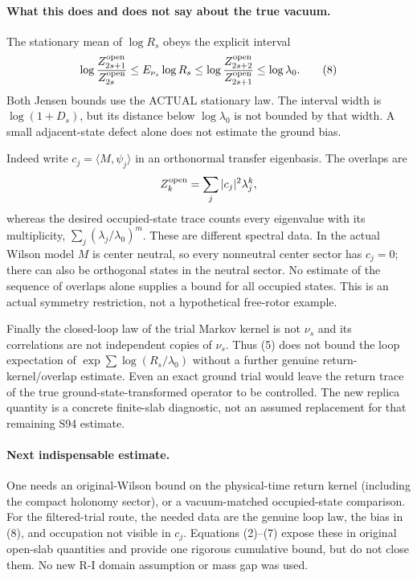 \documentclass[11pt]{article}
\begin{document}
\paragraph{What this does and does not say about the true vacuum.}
The stationary mean of $\log R_s$ obeys the explicit interval
\[
 \log\frac{Z_{2s+1}^{\rm open}}{Z_{2s}^{\rm open}}
 \le E_{\nu_s}\log R_s
 \le\log\frac{Z_{2s+2}^{\rm open}}{Z_{2s+1}^{\rm open}}
 \le\log\lambda_0.                                   \tag{8}
\]
Both Jensen bounds use the ACTUAL stationary law. The interval width is
$\log(1+D_s)$, but its distance below $\log\lambda_0$ is not bounded by that
width. A small adjacent-state defect alone does not estimate the ground bias.

Indeed write $c_j=\langle M,\psi_j\rangle$ in an orthonormal transfer eigenbasis.
The overlaps are
\[
 Z_k^{\rm open}=\sum_j|c_j|^2\lambda_j^k,
\]
whereas the desired occupied-state trace counts every eigenvalue with its
multiplicity, $\sum_j(\lambda_j/\lambda_0)^m$.
These are different spectral data. In the actual Wilson model $M$ is center
neutral, so every nonneutral center sector has $c_j=0$; there can also be
orthogonal states in the neutral sector. No estimate of the sequence of overlaps
alone supplies a bound for all occupied states. This is an actual symmetry
restriction, not a hypothetical free-rotor example.

Finally the closed-loop law of the trial Markov kernel is not $\nu_s$ and its
correlations are not independent copies of $\nu_s$. Thus (5) does not bound the
loop expectation of $\exp\sum\log(R_s/\lambda_0)$ without a further genuine
return-kernel/overlap estimate. Even an exact ground trial would leave the
return trace of the true ground-state-transformed operator to be controlled.
The new replica quantity is a concrete finite-slab diagnostic, not an assumed
replacement for that remaining S94 estimate.

\paragraph{Next indispensable estimate.}
One needs an original-Wilson bound on the physical-time return kernel (including
the compact holonomy sector), or a vacuum-matched occupied-state comparison.
For the filtered-trial route, the needed data are the genuine loop law, the
bias in (8), and occupation not visible in $c_j$. Equations (2)--(7) expose these
in original open-slab quantities and provide one rigorous cumulative bound, but
do not close them. No new R-I domain assumption or mass gap was used.
\end{document}
